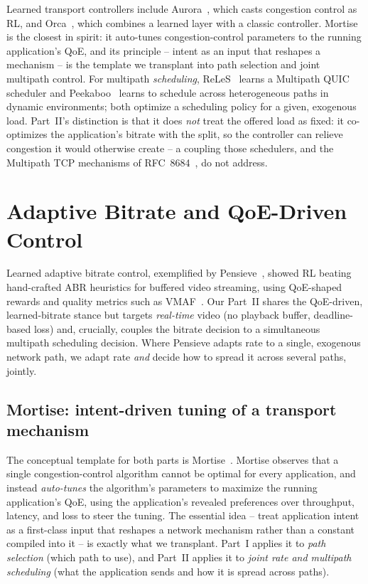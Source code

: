 Learned transport controllers include Aurora~\cite{Jay2019}, which casts congestion control as RL, and
Orca~\cite{Abbasloo2020}, which combines a learned layer with a classic controller. Mortise~\cite{Shen2026}
is the closest in spirit: it auto-tunes congestion-control parameters to the running application's QoE, and
its principle -- intent as an input that reshapes a mechanism -- is the template we transplant into path
selection and joint multipath control. For multipath \emph{scheduling}, ReLeS~\cite{Zhang2019} learns a
Multipath QUIC scheduler and Peekaboo~\cite{Wu2020} learns to schedule across heterogeneous paths in dynamic
environments; both optimize a scheduling policy for a given, exogenous load. Part~II's distinction is that it
does \emph{not} treat the offered load as fixed: it co-optimizes the application's bitrate with the split, so
the controller can relieve congestion it would otherwise create -- a coupling those schedulers, and the
Multipath TCP mechanisms of RFC~8684~\cite{RFC8684}, do not address.

\section{Adaptive Bitrate and QoE-Driven Control}
\label{sec:rel:abr}

Learned adaptive bitrate control, exemplified by Pensieve~\cite{Mao2017}, showed RL beating hand-crafted ABR
heuristics for buffered video streaming, using QoE-shaped rewards and quality metrics such as
VMAF~\cite{VMAF2016}. Our Part~II shares the QoE-driven, learned-bitrate stance but targets \emph{real-time}
video (no playback buffer, deadline-based loss) and, crucially, couples the bitrate decision to a
simultaneous multipath scheduling decision. Where Pensieve adapts rate to a single, exogenous network path,
we adapt rate \emph{and} decide how to spread it across several paths, jointly.


\subsection{Mortise: intent-driven tuning of a transport mechanism}
The conceptual template for both parts is Mortise~\cite{Shen2026}. Mortise observes that a single
congestion-control algorithm cannot be optimal for every application, and instead \emph{auto-tunes}
the algorithm's parameters to maximize the running application's QoE, using the application's revealed
preferences over throughput, latency, and loss to steer the tuning. The essential idea -- treat
application intent as a first-class input that reshapes a network mechanism rather than a constant
compiled into it -- is exactly what we transplant. Part~I applies it to \emph{path selection} (which
path to use), and Part~II applies it to \emph{joint rate and multipath scheduling} (what the
application sends and how it is spread across paths).

